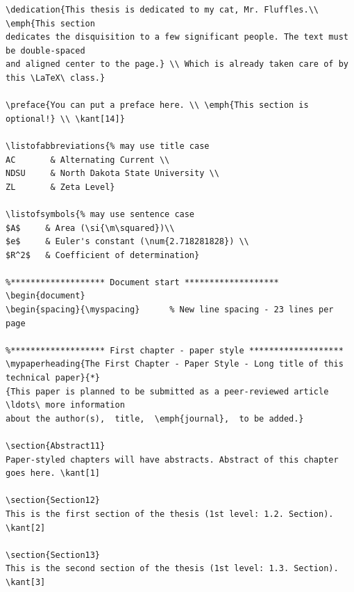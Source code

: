 \documentclass{article}
\begin{document}
\begin{verbatim}
\dedication{This thesis is dedicated to my cat, Mr. Fluffles.\\ \emph{This section
dedicates the disquisition to a few significant people. The text must be double-spaced
and aligned center to the page.} \\ Which is already taken care of by this \LaTeX\ class.}

\preface{You can put a preface here. \\ \emph{This section is optional!} \\ \kant[14]}

\listofabbreviations{% may use title case
AC       & Alternating Current \\
NDSU     & North Dakota State University \\
ZL       & Zeta Level}

\listofsymbols{% may use sentence case
$A$     & Area (\si{\m\squared})\\
$e$     & Euler's constant (\num{2.718281828}) \\
$R^2$   & Coefficient of determination}

%******************* Document start *******************
\begin{document}
\begin{spacing}{\myspacing}      % New line spacing - 23 lines per page

%******************* First chapter - paper style *******************
\mypaperheading{The First Chapter - Paper Style - Long title of this technical paper}{*}
{This paper is planned to be submitted as a peer-reviewed article \ldots\ more information 
about the author(s),  title,  \emph{journal},  to be added.}

\section{Abstract11}
Paper-styled chapters will have abstracts. Abstract of this chapter goes here. \kant[1]

\section{Section12}
This is the first section of the thesis (1st level: 1.2. Section). \kant[2]

\section{Section13}
This is the second section of the thesis (1st level: 1.3. Section). \kant[3]


\end{verbatim}
\end{document}
